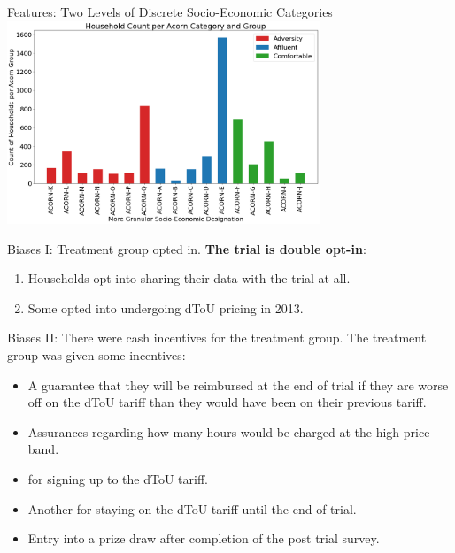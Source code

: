 \documentclass{beamer}
\begin{document}

\begin{frame}{Features: Two Levels of Discrete Socio-Economic Categories}
  \centering
  \includegraphics[width=0.7\textwidth]{images/acorn-group-category-house-count.png}
\end{frame}

\begin{frame}{Biases I: Treatment group opted in.}
  \textbf{The trial is double opt-in}:
  \begin{enumerate}
    \item<+-> Households opt into sharing their data with the trial at all.
    \item<+-> Some opted into undergoing dToU pricing in 2013.
  \end{enumerate}
\end{frame}

\begin{frame}{Biases II: There were cash incentives for the treatment group.}
  The treatment group was given some incentives: 
  \begin{itemize}
    \item A guarantee that they will be reimbursed at the end of trial if they are worse off on the dToU tariff than they would have been on their previous tariff.
    \item Assurances regarding how many hours would be charged at the high price band.
    \item {} for signing up to the dToU tariff.
    \item Another  for staying on the dToU tariff until the end of trial.
    \item Entry into a prize draw after completion of the post trial survey.
  \end{itemize}
\end{frame}
\end{document}
